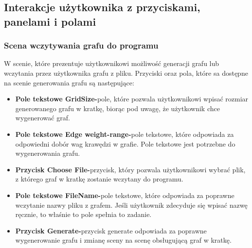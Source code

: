 \documentclass[10pt]{article}
\begin{document}
\subsection{Interakcje użytkownika z przyciskami, panelami i polami}
\subsubsection{Scena wczytywania grafu do programu}
W scenie, które prezentuje użytkownikowi możliwość generacji grafu lub wczytania przez użytkownika grafu z pliku. Przyciski oraz pola, które sa dostępne na scenie generowania grafu są następujące: 
\begin{itemize}
    \item \textbf{Pole tekstowe GridSize-}pole, które pozwala użytkownikowi wpisać rozmiar generowanego grafu w kratkę, biorąc pod uwagę, że użytkownik chce wygenerować graf.
    \item \textbf{Pole tekstowe Edge weight-range-}pole tekstowe, które odpowiada za odpowiedni dobór wag krawędzi w grafie. Pole tekstowe jest potrzebne do wygenerowania grafu.
    \item \textbf{Przycisk Choose File-}przycisk, który pozwala użytkownikowi wybrać plik, z którego graf w kratkę zostanie wczytany do programu.
    \item \textbf{Pole tekstowe FileName-}pole tekstowe, które odpowiada za poprawne wczytanie nazwy pliku z grafem. Jeśli użytkownik zdecyduje się wpisać nazwę ręcznie, to właśnie to pole spełnia to zadanie.
    \item \textbf{Przycisk Generate-}przycisk generate odpowiada za poprawne wygenerowanie grafu i zmianę sceny na scenę obsługującą graf w kratkę.
\end{itemize}
\end{document}
